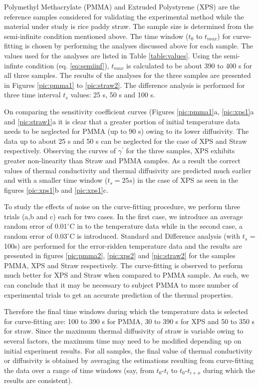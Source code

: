 \documentclass[12pt]{report}
\begin{document}
Polymethyl Methacrylate (PMMA) and Extruded Polystyrene (XPS) are the
reference samples considered for validating the experimental method
while the material under study is rice paddy straw.  The
sample size is determined from the semi-infinite condition mentioned
above. The time window (\(t_0\) to \(t_{max}\)) for curve-fitting is chosen
by performing the analyses discussed above for each sample. The values used for the analyses are listed in Table \ref{table:values}. Using the semi-infinte condition (eq. \ref{eq:semiinf}), $t_{max}$ is calculated to be about 390 to 400 s for all three samples.  The results
of the analyses for the three samples are presented in Figures \ref{pic:pmma1} to \ref{pic:straw2}. The difference analysis is performed for three time interval $t_s$ values: 25 s, 50 s and 100 s.

On comparing the sensitivity coefficient curves (Figures \ref{pic:pmma1}a, \ref{pic:xps1}a and \ref{pic:straw1}a it is clear that a greater portion of initial temperature data needs to be neglected for PMMA (up to 90 s) owing to its lower diffusivity. The data up to about 25 s and 50 s can be neglected for the case of XPS and Straw respectively. Observing the curves of $\gamma^{'}$ for the three samples, XPS exhibits greater non-linearity than Straw and PMMA samples. As a result the correct values of thermal conductivity and thermal diffusivity are predicted much earlier and with a smaller time window ($t_s = 25 s$) in the case of XPS as seen in the figures \ref{pic:xps1}b and \ref{pic:xps1}c.

To study the effects of noise on the curve-fitting procedure, we perform three trials (a,b and c) each for two cases. In the first case, we introduce an average random error of $0.01^{\circ}$C in to the temperature data while in the second case, a random error of $0.03^{\circ}$C is introduced. Standard and Difference analysis (with $t_s$ = 100s) are performed for the error-ridden temperature data and the results are presented in figures \ref{pic:pmma2}, \ref{pic:xps2} and \ref{pic:straw2} for the samples PMMA, XPS and Straw respectively. The curve-fitting is observed to perform much better for XPS and Straw when compared to PMMA sample. As such, we can conclude that it may be necessary to subject PMMA to more number of experimental trials to get an accurate prediction of the thermal properties. 

Therefore the final time windows during which the temperature data is selected for curve-fitting are: 100 to 390 s for PMMA, 30 to 390 s for XPS and 50 to 350 s for straw. Since the maximum thermal diffusivity of straw is variable owing to several factors, the maximum time may need to be modified depending up on initial experiment results. For all samples, the final value of thermal conductivity or diffusivity is obtained by averaging the estimations resulting from curve-fitting the data over a range of time windows (say, from $t_0$-$t_i$ to  $t_0$-$t_{i+x}$ during which the results are consistent).    
\end{document}
